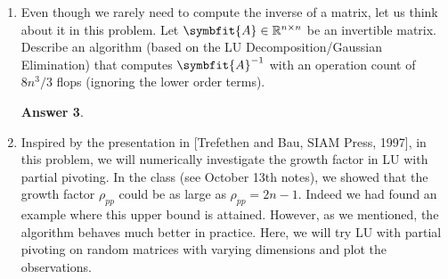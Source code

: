 \documentclass{article}
\theoremstyle{definition}
\newtheorem*{answer}{Answer}
\newcommand{\reals}{\mathbb{R}}
\newcommand{\mat}[1]{\symbfit{#1}}
\begin{document}
\begin{enumerate}[leftmargin=\labelsep]
\begin{enumerate}
		      \item Based on your algorithm, prove/provide the necessary and sufficient determinant conditions for the existence of the UL decomposition.
		            \begin{answer}
		            \end{answer}

		      \item Write a Matlab code to implement the UL decomposition and apply it to
		            \[
			            \mqty[1&0&2&1\\-4&5&3&-1\\-1&3&1&1\\0&2&0&1]
		            \]
		            to verify that your code generates the required decomposition \(\mat{A} = \mat{U}\mat{L}\).
		            \begin{answer}
		            \end{answer}
	      \end{enumerate}

	\item Even though we rarely need to compute the inverse of a matrix, let us think about it in this problem. Let \(\mat{A} \in \reals^{n\times n}\) be an invertible matrix. Describe an algorithm (based on the LU Decomposition/Gaussian Elimination) that computes \(\mat{A}^{-1}\) with an operation count of \(8n^3/3\) flops (ignoring the lower order terms).
	      \begin{answer}
	      \end{answer}

	\item Inspired by the presentation in [Trefethen and Bau, SIAM Press, 1997], in this problem, we will numerically investigate the growth factor in LU with partial pivoting. In the class (see October 13th notes), we showed that the growth factor \(\rho_{pp}\) could be as large as \(\rho_{pp} = 2n-1\). Indeed we had found an example where this upper bound is attained. However, as we mentioned, the algorithm behaves much better in practice. Here, we will try LU with partial pivoting on random matrices with varying dimensions and plot the observations.


\end{enumerate}
\end{document}
